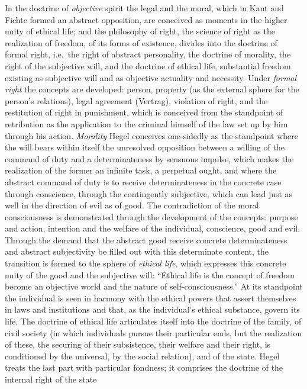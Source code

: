 In the doctrine of \emph{objective} spirit the legal and the moral,
which in Kant and Fichte formed an abstract opposition, are conceived as
moments in the higher unity of ethical life; and the philosophy of
right, the science of right as the realization of freedom, of its forms
of existence, divides into the doctrine of formal right, i.e.\ the right
of abstract personality, the doctrine of morality, the right of the
subjective will, and the doctrine of ethical life, substantial freedom
existing as subjective will and as objective actuality and necessity.
Under \emph{formal right} the concepts are developed: person, property
(as the external sphere for the person's relations), legal agreement
(Vertrag), violation of right, and the restitution of right in
punishment, which is conceived from the standpoint of retribution as the
application to the criminal himself of the law set up by him through his
action. \emph{Morality} Hegel conceives one-sidedly as the standpoint
where the will bears within itself the unresolved opposition between a
willing of the command of duty and a determinateness by sensuous
impulse, which makes the realization of the former an infinite task, a
perpetual ought, and where the abstract command of duty is to receive
determinateness in the concrete case through conscience, through the
contingently subjective, which can lead just as well in the direction of
evil as of good. The contradiction of the moral consciousness is
demonstrated through the development of the concepts: purpose
and action, intention and the welfare of the individual, conscience,
good and evil. Through the demand that the abstract good receive
concrete determinateness and abstract subjectivity be filled out with
this determinate content, the transition is formed to the sphere of
\emph{ethical life}, which expresses this concrete unity of the good and
the subjective will: ``Ethical life is the concept of freedom become an
objective world and the nature of self-consciousness.'' At its
standpoint the individual is seen in harmony with the ethical powers
that assert themselves in laws and institutions and that, as the
individual's ethical substance, govern its life. The doctrine of ethical
life articulates itself into the doctrine of the family, of civil
society (in which individuals pursue their particular ends, but the
realization of these, the securing of their subsistence, their welfare
and their right, is conditioned by the universal, by the social
relation), and of the state. Hegel treats the last part with particular
fondness; it comprises the doctrine of the internal right of the state
